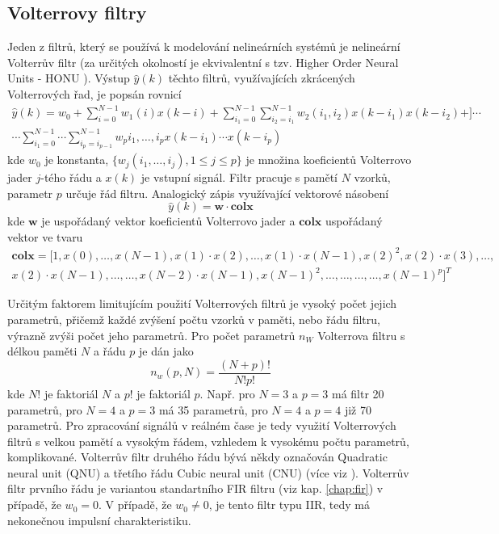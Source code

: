 \subsection{Volterrovy filtry}\label{chap:volterra}
Jeden z filtrů, který se používá k modelování nelineárních systémů je nelineární Volterrův filtr (za určitých okolností je ekvivalentní s tzv. Higher Order Neural Units - HONU \cite{honu}). Výstup $\hat{y}(k)$ těchto filtrů, využívajících zkrácených Volterrových řad, je popsán rovnicí 
\begin{multline}
    \hat{y}(k)=w_0+\sum_{i=0}^{N-1}w_1(i)x(k-i) +  \sum_{i_1=0}^{N-1}\sum_{i_2=i_1}^{N-1}w_2(i_1,i_2)x(k-i_1)x(k-i_2)+] \cdots \\\cdots  \sum_{i_1=0}^{N-1} \cdots \sum_{i_p=i_{p-1}}^{N-1}w_p{i_1,\dots,i_p}x(k-i_1)\cdots x(k-i_p)
\end{multline}
kde $w_0$ je konstanta, $\{w_j(i_1,\dots,i_j), 1 \leq j \leq p\}$ je množina koeficientů Volterrovo jader $j$-tého řádu a $x(k)$ je vstupní signál. Filtr pracuje s pamětí $N$ vzorků, parametr $p$ určuje řád filtru. Analogický zápis využívající vektorové násobení
\begin{equation}
    \hat{y}(k)= \textbf{w} \cdot \textbf{colx}
\end{equation}
kde $\textbf{w}$ je uspořádaný vektor koeficientů Volterrovo jader a $\textbf{colx}$ uspořádaný vektor ve tvaru
\begin{multline}
    \textbf{colx}=[1,x(0),\dots,x(N-1),x(1) \cdot x(2), \dots, x(1)\cdot x(N-1),x(2)^2,x(2)\cdot x(3), \dots,\\ x(2) \cdot x(N-1),\dots, \dots,x(N-2)\cdot x(N-1), x(N-1)^2,\dots, \dots, \dots, \dots, x(N-1)^p]^T 
\end{multline}

Určitým faktorem limitujícím použití Volterrových filtrů je vysoký počet jejich parametrů, přičemž každé zvýšení počtu vzorků v paměti, nebo řádu filtru, výrazně zvýši počet jeho parametrů. Pro počet parametrů $n_W$ Volterrova filtru s délkou paměti $N$ a řádu $p$ je dán jako
\begin{equation}
    n_w(p,N)=\frac{(N+p)!}{N!p!}
\end{equation}
kde $N!$ je faktoriál $N$ a $p!$ je faktoriál $p$. Např. pro $N=3$ a $p=3$ má filtr 20 parametrů, pro $N=4$ a $p=3$ má 35 parametrů, pro  $N=4$ a $p=4$ již 70 parametrů. Pro zpracování signálů v reálném čase je tedy využití  Volterrových filtrů s velkou pamětí a vysokým řádem, vzhledem k vysokému počtu parametrů, komplikované. Volterrův filtr druhého řádu bývá někdy označován Quadratic neural unit (QNU) a třetího řádu Cubic neural unit (CNU) (více viz \cite{honu}). Volterrův filtr prvního řádu je variantou standartního FIR filtru (viz kap. \ref{chap:fir}) v případě, že $w_0=0$. V případě, že $w_0\neq 0$, je tento filtr typu IIR, tedy má nekonečnou impulsní charakteristiku.

